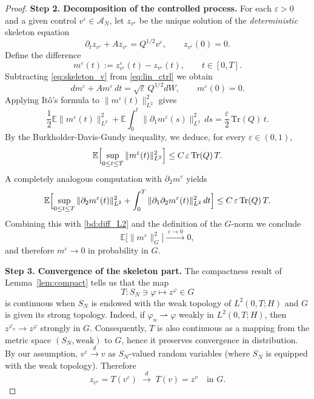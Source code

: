 \documentclass[11pt,a4paper,reqno]{amsart}
\theoremstyle{definition}
\begin{document}
\begin{proof}
  \medskip
  \textbf{Step 2. Decomposition of the controlled process.}
For each $\varepsilon>0$ and a given control $v^\varepsilon\in\mathcal A_N$, let
$z_{v^\varepsilon}$ be the unique solution of the \emph{deterministic} skeleton equation
\begin{equation}\label{eq:skeleton_v}
  \partial_t z_{v^\varepsilon} + A z_{v^\varepsilon} = Q^{1/2} v^\varepsilon,\qquad
  z_{v^\varepsilon}(0)=0 .
\end{equation}
Define the difference
\[
  m^\varepsilon(t) := z^\varepsilon_{v^\varepsilon}(t) - z_{v^\varepsilon}(t),\qquad t\in[0,T].
\]
Subtracting \eqref{eq:skeleton_v} from \eqref{eq:lin_ctrl} we obtain
\[
  dm^\varepsilon + A m^\varepsilon\,dt = \sqrt{\varepsilon}\,Q^{1/2}dW,\qquad m^\varepsilon(0)=0 .
\]
Applying It\^o's formula to $\|m^\varepsilon(t)\|_{L^2}^2$ gives
\[
  \frac12 \mathbb{E}\|m^\varepsilon(t)\|_{L^2}^2 + \mathbb{E}\int_0^t \|\partial_1 m^\varepsilon(s)\|_{L^2}^2\,ds
  = \frac{\varepsilon}{2}\, \mathrm{Tr}(Q)\,t .
\]
By the Burkholder-Davis-Gundy inequality, we deduce, for every $\varepsilon\in(0,1)$,
\begin{equation}\label{bd:diff_L2}
  \mathbb{E}\Bigl[ \sup_{0\le t\le T}\|m^\varepsilon(t)\|_{L^2}^2 \Bigr] \le C\,\varepsilon\,\mathrm{Tr}(Q)\,T .
\end{equation}
A completely analogous computation with $\partial_2 m^\varepsilon$ yields
\[
  \mathbb{E}\Bigl[ \sup_{0\le t\le T}\|\partial_2 m^\varepsilon(t)\|_{L^2}^2
    + \int_0^T \|\partial_1\partial_2 m^\varepsilon(t)\|_{L^2}^2\,dt \Bigr]
  \le C\,\varepsilon\,\mathrm{Tr}(Q)\,T .
\]
Combining this with \eqref{bd:diff_L2} and the definition of the $G$-norm we conclude
\begin{equation}\label{conv_diff_zero}
  \mathbb{E}\bigl[ \|m^\varepsilon\|_G^2 \bigr] \xrightarrow{\;\varepsilon\to0\;} 0,
\end{equation}
and therefore $m^\varepsilon \to 0$ in probability in $G$.

\medskip
\noindent\textbf{Step 3. Convergence of the skeleton part.}
The compactness result of Lemma~\ref{lem:compact} tells us that the map
\[
  T: S_N \ni \varphi \longmapsto z^\varphi \in G
\]
is continuous when $S_N$ is endowed with the weak topology of $L^2(0,T;H)$ and $G$
is given its strong topology. Indeed, if $\varphi_n\rightharpoonup\varphi$ weakly in
$L^2(0,T;H)$, then $z^{\varphi_n}\to z^\varphi$ strongly in $G$. Consequently, $T$ is
also continuous as a mapping from the metric space $(S_N, \text{weak})$ to $G$, hence
it preserves convergence in distribution.
By our assumption, $v^\varepsilon \xrightarrow{\;d\;} v$ as $S_N$-valued random
variables (where $S_N$ is equipped with the weak topology). Therefore
\begin{equation}\label{conv_skeleton}
  z_{v^\varepsilon} = T(v^\varepsilon) \;\xrightarrow{\;d\;}\; T(v) = z^v \quad\text{in } G .
\end{equation}




\end{proof}
\end{document}
